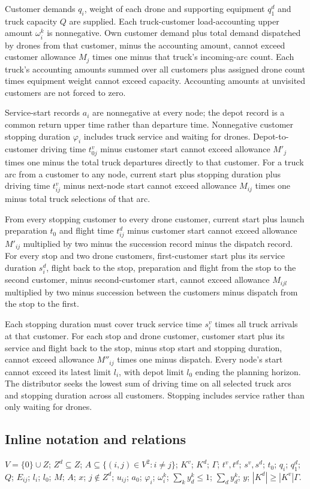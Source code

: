 \documentclass[10pt]{article}
\begin{document}
Customer demands $q_i$, weight of each drone and supporting equipment $q_1^d$ and truck capacity $Q$ are supplied. Each truck-customer load-accounting upper amount $\omega_i^k$ is nonnegative. Own customer demand plus total demand dispatched by drones from that customer, minus the accounting amount, cannot exceed customer allowance $M_j$ times one minus that truck's incoming-arc count. Each truck's accounting amounts summed over all customers plus assigned drone count times equipment weight cannot exceed capacity. Accounting amounts at unvisited customers are not forced to zero.

Service-start records $a_i$ are nonnegative at every node; the depot record is a common return upper time rather than departure time. Nonnegative customer stopping duration $\varphi_i$ includes truck service and waiting for drones. Depot-to-customer driving time $t_{0j}^v$ minus customer start cannot exceed allowance $M'_j$ times one minus the total truck departures directly to that customer. For a truck arc from a customer to any node, current start plus stopping duration plus driving time $t_{ij}^v$ minus next-node start cannot exceed allowance $M_{ij}$ times one minus total truck selections of that arc.

From every stopping customer to every drone customer, current start plus launch preparation $t_0$ and flight time $t_{ij}^d$ minus customer start cannot exceed allowance $M'_{ij}$ multiplied by two minus the succession record minus the dispatch record. For every stop and two drone customers, first-customer start plus its service duration $s_i^d$, flight back to the stop, preparation and flight from the stop to the second customer, minus second-customer start, cannot exceed allowance $M_{ijl}$ multiplied by two minus succession between the customers minus dispatch from the stop to the first.

Each stopping duration must cover truck service time $s_i^v$ times all truck arrivals at that customer. For each stop and drone customer, customer start plus its service and flight back to the stop, minus stop start and stopping duration, cannot exceed allowance $M''_{ij}$ times one minus dispatch. Every node's start cannot exceed its latest limit $l_i$, with depot limit $l_0$ ending the planning horizon. The distributor seeks the lowest sum of driving time on all selected truck arcs and stopping duration across all customers. Stopping includes service rather than only waiting for drones.

\subsection*{Inline notation and relations}
$V=\{0\}\cup Z$; $Z^d\subseteq Z$; $A\subseteq\{(i,j)\in V^2:i\ne j\}$; $K^v$; $K^d$; $\Gamma$; $t^v,t^d$; $s^v,s^d$; $t_0$; $q_i$; $q_1^d$; $Q$; $E_{ij}$; $l_i$; $l_0$; $M$; $A$; $x$; $j\notin Z^d$; $u_{ij}$; $a_0$; $\varphi_i$; $\omega_i^k$; $\sum_k y_d^k\le1$; $\sum_d y_d^k$; $y$; $|K^d|\ge |K^v|\Gamma$.
\end{document}
